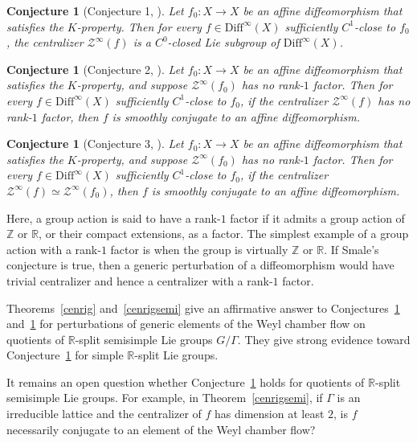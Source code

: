 \documentclass[11pt]{amsart}
\numberwithin{equation}{section}
\newcommand{\R}{\mathbb{R}}
\newcommand{\Z}{\mathbb{Z}}
\theoremstyle{plain}
\newtheorem{conj}[thm]{Conjecture}
\begin{document}
\begin{conj}[Conjecture 1, \cite{DWWX}]\label{DWXconj1}
Let $f_0:X\to X$ be an affine diffeomorphism that satisfies the $K$-property. Then for every $f\in \mathrm{Diff}^\infty(X)$ sufficiently $C^1$-close to $f_0$, the centralizer $\mathcal{Z}^\infty(f)$ is a $C^0$-closed Lie subgroup of $\mathrm{Diff}^\infty(X)$.
\end{conj}

\begin{conj}[Conjecture 2, \cite{DWWX}]\label{DWXconj3}
Let $f_0:X\to X$ be an affine diffeomorphism that satisfies the $K$-property, and suppose $\mathcal{Z}^\infty(f_0)$ has no rank-$1$ factor. Then for every $f\in \mathrm{Diff}^\infty(X)$ sufficiently $C^1$-close to $f_0$, if the centralizer $\mathcal{Z}^\infty(f)$ has no rank-$1$ factor, then $f$ is smoothly conjugate to an affine diffeomorphism.
\end{conj}

\begin{conj}[Conjecture 3, \cite{DWWX}]\label{DWXconj2}
Let $f_0:X\to X$ be an affine diffeomorphism that satisfies the $K$-property, and suppose $\mathcal{Z}^\infty(f_0)$ has no rank-$1$ factor. Then for every $f\in \mathrm{Diff}^\infty(X)$ sufficiently $C^1$-close to $f_0$, if the centralizer $\mathcal{Z}^\infty(f)\simeq \mathcal{Z}^\infty(f_0)$, then $f$ is smoothly conjugate to an affine diffeomorphism.
\end{conj}

Here, a group action is said to have a rank-$1$ factor if it admits a group action of $\Z$ or $\R$, or their compact extensions, as a factor. The simplest example of a group action with a rank-$1$ factor is when the group is virtually $\Z$ or $\R$. If Smale's conjecture is true, then a generic perturbation of a diffeomorphism would have trivial centralizer and hence a centralizer with a rank-$1$ factor.

Theorems~\ref{cenrig} and~\ref{cenrigsemi} give an affirmative answer to Conjectures~\ref{DWXconj1} and~\ref{DWXconj2} for perturbations of generic elements of the Weyl chamber flow on quotients of $\R$-split semisimple Lie groups $G/\Gamma$. They give strong evidence toward Conjecture~\ref{DWXconj3} for simple $\R$-split Lie groups.

It remains an open question whether Conjecture~\ref{DWXconj3} holds for quotients of $\R$-split semisimple Lie groups. For example, in Theorem~\ref{cenrigsemi}, if $\Gamma$ is an irreducible lattice and the centralizer of $f$ has dimension at least $2$, is $f$ necessarily conjugate to an element of the Weyl chamber flow?
\end{document}
